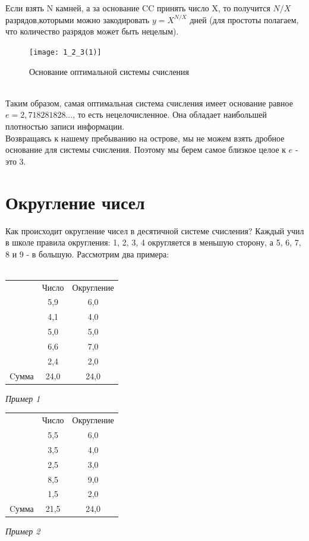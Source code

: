 \\\\Если взять N камней, а за основание CC принять число X, то получится $N/X$ разрядов,которыми можно закодировать $y=X^{N/X}$ дней (для простоты полагаем, что количество разрядов может быть нецелым).
\begin{figure}[h]
\centering
\texttt{[image: 1\_2\_3(1)]}
\caption{Основание оптимальной системы счисления}
\end{figure}
\\Таким образом, самая оптимальная система счисления имеет основание равное $e = 2,718281828...$, то есть нецелочисленное. Она обладает наибольшей плотностью записи информации.
\\Возвращаясь к нашему пребыванию на острове, мы не можем взять дробное основание для системы счисления. Поэтому мы берем самое близкое целое к $e$ - это $3$.

\section{Округление чисел}

Как происходит округление чисел в десятичной системе счисления? Каждый учил в школе правила округления: 1, 2, 3, 4 округляется в меньшую сторону, а 5, 6, 7, 8 и 9 - в большую.
Рассмотрим два примера:
\\
\\
\begin{minipage}[c]{6cm}
\begin{center}
\begin{tabular}{|c|c|c|}
\hline  & Число & Округление
\\\hhline{~--} & 5,9 & 6,0
\\ & 4,1 & 4,0
\\ & 5,0 & 5,0
\\ & 6,6 & 7,0
\\ & 2,4 & 2,0
\\\hline Cумма & 24,0 & 24,0
\\\hline
\end{tabular}
\emph{Пример 1}
\newline
\end{center}
\end{minipage}
\begin{minipage}[c]{6cm}
\begin{center}
\begin{tabular}{|c|c|c|}
\hline & Число & Округление
\\\hhline{~--}  & 5,5 & 6,0
\\ & 3,5 & 4,0
\\ & 2,5 & 3,0
\\ & 8,5 & 9,0
\\ & 1,5 & 2,0
\\\hline Cумма & 21,5 & 24,0
\\\hline
\end{tabular}
\emph{Пример 2}
\newline
\end{center}
\end{minipage}


